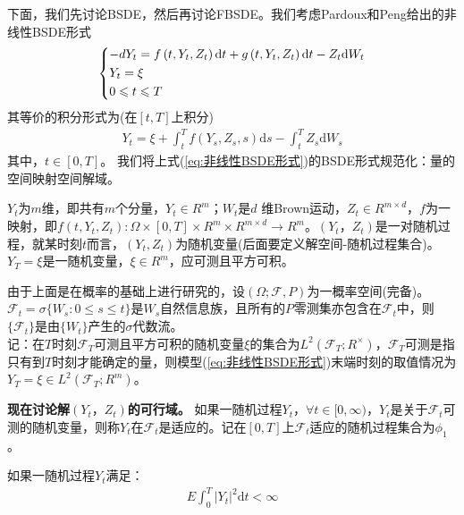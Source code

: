 			下面，我们先讨论BSDE，然后再讨论FBSDE。我们考虑Pardoux和Peng给出的非线性BSDE形式
				\begin{align}\label{eq:非线性BSDE形式}
				\centering
				\left\{\begin{lgathered}
				{ - d{Y_t} = f\left( {t,{Y_t},{Z_t}} \right)\mathrm{d}t + g\left( {t,{Y_t},{Z_t}} \right)\mathrm{d}t - {Z_t}\mathrm{d}{W_t}}\\
				{{Y_t} = \xi }\\
				{0 \leqslant t \leqslant T}
				\end{lgathered} \right.
				\end{align}
			其等价的积分形式为(在$[t,T]$上积分)
			\begin{align*}
			Y_t = \xi + {\int_t^T {f({Y_s},{Z_s},s)\mathrm{d}s}} - {\int_t^T }{{Z_s}\mathrm{d}{W_s}} \end{align*}
			其中，$t \in [{0,T}]$。
			我们将上式(\ref{eq:非线性BSDE形式})的BSDE形式规范化：量的空间映射空间解域。
			\par
			$Y_t$为$m$维，即共有$m$个分量，$Y_t \in {R^m}$；$W_t$是$d$ 维Brown运动，$Z_t \in {R^{m\times d}}$，$f$为一映射，即${f({t,Y_t,Z_t})}:{\Omega  \times [0,T] \times {R^m} \times {R^{m \times d}} \to {R^m}}$。$(Y_t，Z_t)$是一对随机过程，就某时刻$t$而言，$(Y_t,Z_t)$为随机变量(后面要定义解空间-随机过程集合)。$ {Y_T} = \xi $是一随机变量，$\xi  \in {R^m}$，应可测且平方可积。
			\par
			由于上面是在概率的基础上进行研究的，设$(\Omega ; {\mathcal{F},P})$为一概率空间(完备)。
			${\mathcal {F}}_t=\sigma \{ {W_s}: 0 \leqslant s \leqslant t \} $是${W_s}$自然信息族，且所有的${P_{}}$零测集亦包含在${\mathcal{F}}_t$中，则$\{ {\mathcal{F}}_t \}$是由$\{ W_t \}$产生的$\sigma$代数流。\\
			记：在$T$时刻${\mathcal {F}}_T$可测且平方可积的随机变量$\xi $的集合为$L^2({{\mathcal {F}}_T};R^\times)$，${{\mathcal {F}}_T}$可测是指只有到$T$时刻才能确定的量，则模型(\ref{eq:非线性BSDE形式})末端时刻的取值情况为$Y_T = \xi\in L^2({{\mathcal {F}}_T};R^m)$。
			\par
			\textbf{现在讨论解$(Y_t，Z_t)$的可行域。} 如果一随机过程${Y_t}$，$\forall t \in [ {0,\infty }) $，$Y_t$是关于${{\mathcal {F}}_t}$可测的随机变量，则称$Y_t$在${{\mathcal {F}}_t}$是适应的。记在$[0,T]$上${{\mathcal {F}}_t}$适应的随机过程集合为${\phi}_1 $。
			\par
			如果一随机过程$Y_t$满足：
			\begin{align*}
			E\int_0^T {{{\left| {{Y_t}} \right|}^2}\mathrm{d}t < \infty }
			\end{align*}
